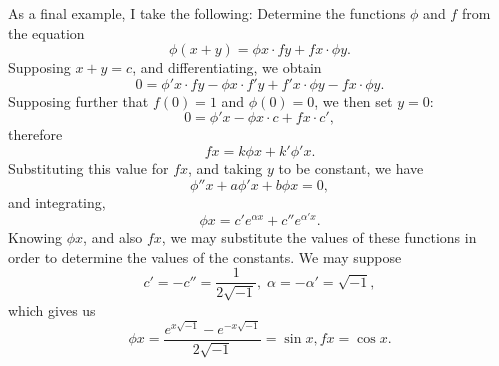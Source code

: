 \documentclass[12pt]{article}
\begin{document}
As a final example, I take the following: Determine the functions $\phi$ and $f$ from the equation
\[ \phi(x+y) = \phi x \cdot f y + fx \cdot \phi y .\]
Supposing $x+y = c$, and differentiating, we obtain
\[ 0 = \phi' x \cdot fy - \phi x \cdot f' y + f'x \cdot \phi y - f x \cdot \phi y. \]
Supposing further that $f(0) = 1$ and $\phi(0) = 0$, we then set $y = 0$:
\[ 0 = \phi' x - \phi x \cdot c + f x \cdot c', \]
therefore 
\[ f x = k \phi x + k' \phi ' x. \]
Substituting this value for $f x$, and taking $y$ to be constant, we have 
\[ \phi '' x + a \phi' x + b \phi x = 0, \]
and integrating,
\[ \phi x = c' e^{\alpha x} + c'' e^{\alpha' x} .\] 
Knowing $\phi x$, and also $fx$, we may substitute the values of these functions in order to determine the values of the constants.  We may suppose 
\[ c' = -c'' = \frac{1}{2 \sqrt{-1}} , \; \alpha = -\alpha' = \sqrt{-1}, \]
which gives us 
\[ \phi x = \frac{e^{ x \sqrt{-1}} - e^{-x \sqrt{-1}} }{2 \sqrt{-1}} = \sin x, fx = \cos x. \]


 
\end{document}
